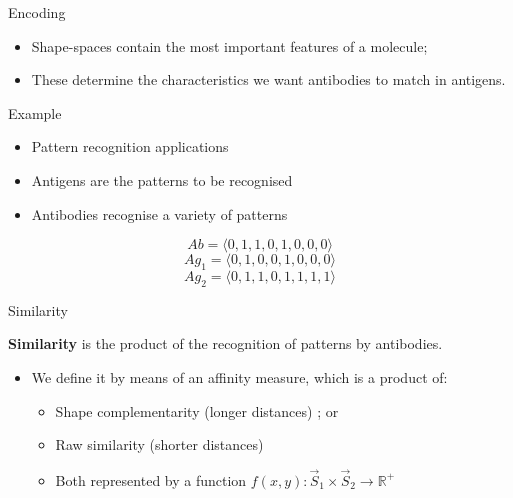 \documentclass[xcolor=svgnames]{beamer}
\begin{document}
        \begin{frame}{Encoding}
            \begin{itemize}
	            \item Shape-spaces contain the most important features of a molecule;
	            \vspace{1em}
	            \item These determine the characteristics we want antibodies to match in antigens.
			\end{itemize}
		\end{frame}
      
      	\begin{frame}{Example}
      	
            
            \begin{itemize}
                \item Pattern recognition applications
                \item Antigens are the patterns to be recognised
                \item Antibodies recognise a variety of patterns
            \end{itemize}            
            \vspace{1em}
            
            $$Ab = \langle 0, 1, 1, 0, 1, 0, 0, 0 \rangle$$
            $$Ag_{1} = \langle 0, 1, 0, 0, 1, 0, 0, 0 \rangle$$
            $$Ag_{2} = \langle 0, 1, 1, 0, 1, 1, 1, 1 \rangle$$
            
            
		\end{frame}
      
        \begin{frame}{Similarity}            
        	
        	\textbf{Similarity} is the product of the recognition of patterns by antibodies.
        	\vspace{1em}
            \begin{itemize}
				\item We define it by means of an affinity measure, which is a product of:
                \begin{itemize}
                    \item Shape complementarity (longer distances) ; or %
                    \item Raw similarity (shorter distances) %
                \end{itemize}
				\vspace{0.5em}
				\begin{itemize}
					\item Both represented by a function $f(x,y): \vec{S}_1 \times \vec{S}_2 \rightarrow \mathbb{R}^+$
				\end{itemize}
        	\end{itemize}    
        \end{frame}
		
\end{document}

